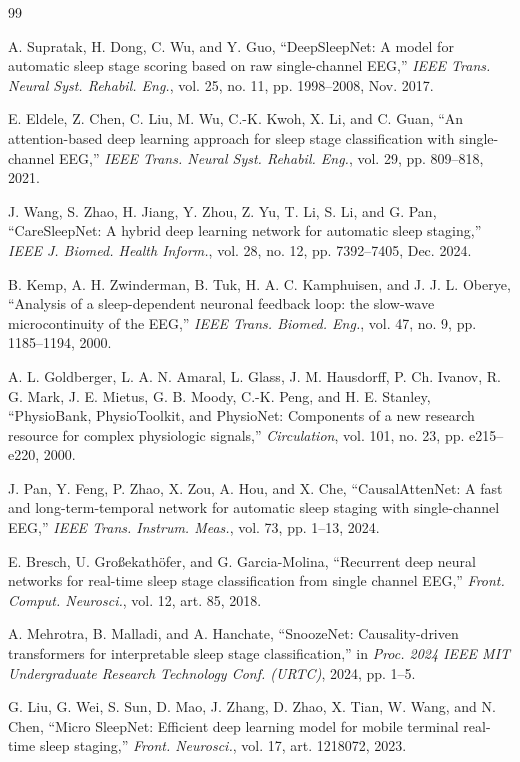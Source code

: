 \documentclass[conference]{IEEEtran}
\begin{document}
\begin{thebibliography}{99}

 A. Supratak, H. Dong, C. Wu, and Y. Guo, ``DeepSleepNet: A model for automatic sleep stage
scoring based on raw single-channel EEG,'' \emph{IEEE Trans. Neural Syst. Rehabil. Eng.}, vol. 25, no. 11,
pp. 1998--2008, Nov. 2017.

 E. Eldele, Z. Chen, C. Liu, M. Wu, C.-K. Kwoh, X. Li, and C. Guan, ``An attention-based deep
learning approach for sleep stage classification with single-channel EEG,'' \emph{IEEE Trans. Neural Syst.
Rehabil. Eng.}, vol. 29, pp. 809--818, 2021.

 J. Wang, S. Zhao, H. Jiang, Y. Zhou, Z. Yu, T. Li, S. Li, and G. Pan, ``CareSleepNet: A
hybrid deep learning network for automatic sleep staging,'' \emph{IEEE J. Biomed. Health Inform.}, vol. 28,
no. 12, pp. 7392--7405, Dec. 2024.

 B. Kemp, A. H. Zwinderman, B. Tuk, H. A. C. Kamphuisen, and J. J. L. Oberye, ``Analysis of a
sleep-dependent neuronal feedback loop: the slow-wave microcontinuity of the EEG,'' \emph{IEEE Trans. Biomed.
Eng.}, vol. 47, no. 9, pp. 1185--1194, 2000.

 A. L. Goldberger, L. A. N. Amaral, L. Glass, J. M. Hausdorff, P. Ch. Ivanov, R. G. Mark,
J. E. Mietus, G. B. Moody, C.-K. Peng, and H. E. Stanley, ``PhysioBank, PhysioToolkit, and PhysioNet: Components
of a new research resource for complex physiologic signals,'' \emph{Circulation}, vol. 101, no. 23,
pp. e215--e220, 2000.

 J. Pan, Y. Feng, P. Zhao, X. Zou, A. Hou, and X. Che, ``CausalAttenNet: A fast and
long-term-temporal network for automatic sleep staging with single-channel EEG,'' \emph{IEEE Trans. Instrum.
Meas.}, vol. 73, pp. 1--13, 2024.

 E. Bresch, U. Gro\ss{}ekath\"ofer, and G. Garcia-Molina, ``Recurrent deep neural networks for
real-time sleep stage classification from single channel EEG,'' \emph{Front. Comput. Neurosci.}, vol. 12,
art. 85, 2018.

 A. Mehrotra, B. Malladi, and A. Hanchate, ``SnoozeNet: Causality-driven transformers for
interpretable sleep stage classification,'' in \emph{Proc. 2024 IEEE MIT Undergraduate Research Technology Conf.
(URTC)}, 2024, pp. 1--5.

 G. Liu, G. Wei, S. Sun, D. Mao, J. Zhang, D. Zhao, X. Tian, W. Wang, and N. Chen, ``Micro
SleepNet: Efficient deep learning model for mobile terminal real-time sleep staging,'' \emph{Front. Neurosci.},
vol. 17, art. 1218072, 2023.


\end{thebibliography}
\end{document}
